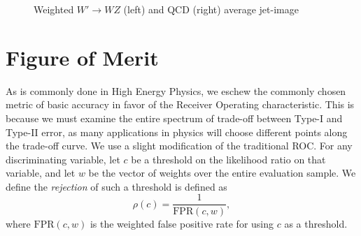 \documentclass{article}
\begin{document}
\begin{figure}[bt]
  \begin{center}
  
      \caption{Weighted $W'\rightarrow WZ$ (left) and QCD (right) average jet-image
      \label{fig:meanImages} }
    \end{center}
\end{figure}  



\section{Figure of Merit} %
\label{sec:figure_of_merit}

As is commonly done in High Energy Physics, we eschew the commonly chosen metric of basic accuracy in favor of the Receiver Operating characteristic. This is because we must examine the entire spectrum of trade-off between Type-I and Type-II error, as many applications in physics will choose different points along the trade-off curve. We use a slight modification of the traditional ROC. For any discriminating variable, let $c$ be a threshold on the likelihood ratio on that variable, and let $w$ be the vector of weights over the entire evaluation sample. We define the \emph{rejection} of such a threshold is defined as 
$$
    \rho(c) = \frac{1}{\text{FPR}(c, w)},
$$
where $\text{FPR}(c, w)$ is the weighted false positive rate for using $c$ as a threshold.
\end{document}
